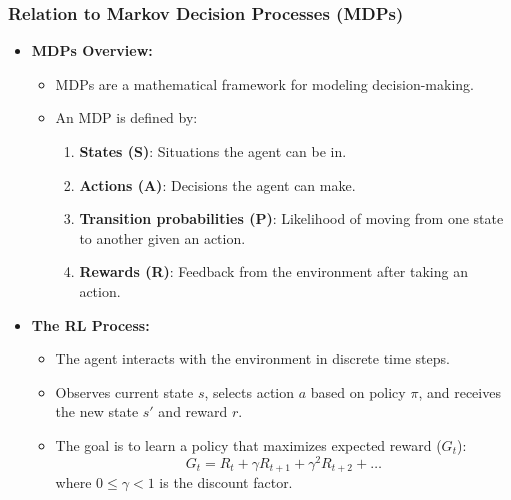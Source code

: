 \documentclass[aspectratio=169]{beamer}
\begin{document}
\begin{frame}[fragile]
    \frametitle{Relation to Markov Decision Processes (MDPs)}

    \begin{itemize}
        \item \textbf{MDPs Overview:}
        \begin{itemize}
            \item MDPs are a mathematical framework for modeling decision-making.
            \item An MDP is defined by:
            \begin{enumerate}
                \item \textbf{States (S)}: Situations the agent can be in.
                \item \textbf{Actions (A)}: Decisions the agent can make.
                \item \textbf{Transition probabilities (P)}: Likelihood of moving from one state to another given an action.
                \item \textbf{Rewards (R)}: Feedback from the environment after taking an action.
            \end{enumerate}
        \end{itemize}

        \item \textbf{The RL Process:}
        \begin{itemize}
            \item The agent interacts with the environment in discrete time steps.
            \item Observes current state $s$, selects action $a$ based on policy $\pi$, and receives the new state $s'$ and reward $r$.
            \item The goal is to learn a policy that maximizes expected reward ($G_t$):
            \begin{equation}
                G_t = R_t + \gamma R_{t+1} + \gamma^2 R_{t+2} + \ldots
            \end{equation}
            where $0 \leq \gamma < 1$ is the discount factor.
        \end{itemize}
    \end{itemize}
\end{frame}
\end{document}
